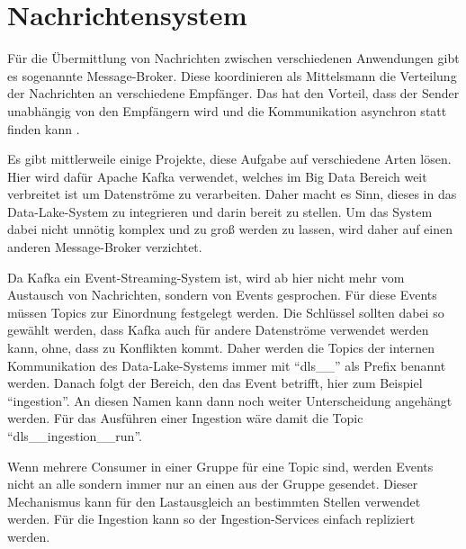 \section{Nachrichtensystem}

Für die Übermittlung von Nachrichten zwischen verschiedenen Anwendungen gibt es sogenannte Message-Broker.
Diese koordinieren als Mittelsmann die Verteilung der Nachrichten an verschiedene Empfänger.
Das hat den Vorteil, dass der Sender unabhängig von den Empfängern wird und die Kommunikation asynchron statt finden kann \parencite{message-broker}.

Es gibt mittlerweile einige Projekte, diese Aufgabe auf verschiedene Arten lösen.
Hier wird dafür Apache Kafka verwendet, welches im Big Data Bereich weit verbreitet ist um Datenströme zu verarbeiten.
Daher macht es Sinn, dieses in das Data-Lake-System zu integrieren und darin bereit zu stellen.
Um das System dabei nicht unnötig komplex und zu groß werden zu lassen, wird daher auf einen anderen Message-Broker verzichtet.

Da Kafka ein Event-Streaming-System ist, wird ab hier nicht mehr vom Austausch von Nachrichten, sondern von Events gesprochen.
Für diese Events müssen Topics zur Einordnung festgelegt werden.
Die Schlüssel sollten dabei so gewählt werden, dass Kafka auch für andere Datenströme verwendet werden kann, ohne, dass zu Konflikten kommt.
Daher werden die Topics der internen Kommunikation des Data-Lake-Systems immer mit "`dls\_\_"' als Prefix benannt werden.
Danach folgt der Bereich, den das Event betrifft, hier zum Beispiel "`ingestion"'.
An diesen Namen kann dann noch weiter Unterscheidung angehängt werden.
Für das Ausführen einer Ingestion wäre damit die Topic "`dls\_\_ingestion\_\_run"'.

Wenn mehrere Consumer in einer Gruppe für eine Topic sind, werden Events nicht an alle sondern immer nur an einen aus der Gruppe gesendet.
Dieser Mechanismus kann für den Lastausgleich an bestimmten Stellen verwendet werden.
Für die Ingestion kann so der Ingestion-Services einfach repliziert werden.